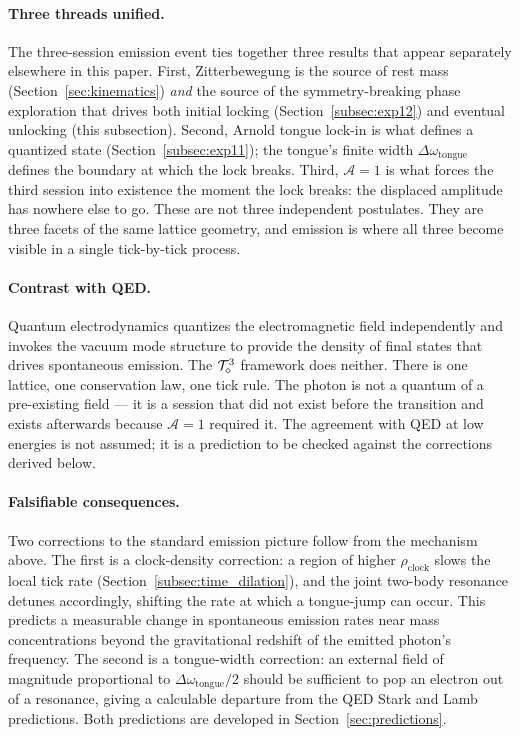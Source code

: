 \paragraph{Three threads unified.}
The three-session emission event ties together three results that
appear separately elsewhere in this paper.
First, Zitterbewegung is the source of rest mass
(Section~\ref{sec:kinematics}) \emph{and} the source of the
symmetry-breaking phase exploration that drives both initial locking
(Section~\ref{subsec:exp12}) and eventual unlocking
(this subsection).
Second, Arnold tongue lock-in is what defines a quantized state
(Section~\ref{subsec:exp11}); the tongue's finite width
$\Delta\omega_\text{tongue}$ defines the boundary at which the lock
breaks.
Third, $\mathcal{A}=1$ is what forces the third session into existence
the moment the lock breaks: the displaced amplitude has nowhere else
to go.
These are not three independent postulates.
They are three facets of the same lattice geometry, and emission is
where all three become visible in a single tick-by-tick process.

\paragraph{Contrast with QED.}
Quantum electrodynamics quantizes the electromagnetic field
independently and invokes the vacuum mode structure to provide the
density of final states that drives spontaneous emission.
The $\mathcal{T}_\diamond^3$ framework does neither.
There is one lattice, one conservation law, one tick rule.
The photon is not a quantum of a pre-existing field --- it is a session
that did not exist before the transition and exists afterwards because
$\mathcal{A}=1$ required it.
The agreement with QED at low energies is not assumed; it is a
prediction to be checked against the corrections derived below.

\paragraph{Falsifiable consequences.}
Two corrections to the standard emission picture follow from the
mechanism above.
The first is a clock-density correction: a region of higher
$\rho_\text{clock}$ slows the local tick rate
(Section~\ref{subsec:time_dilation}), and the joint two-body resonance
detunes accordingly, shifting the rate at which a tongue-jump can occur.
This predicts a measurable change in spontaneous emission rates near
mass concentrations beyond the gravitational redshift of the emitted
photon's frequency.
The second is a tongue-width correction: an external field of magnitude
proportional to $\Delta\omega_\text{tongue}/2$ should be sufficient to
pop an electron out of a resonance, giving a calculable departure from
the QED Stark and Lamb predictions.
Both predictions are developed in Section~\ref{sec:predictions}.

